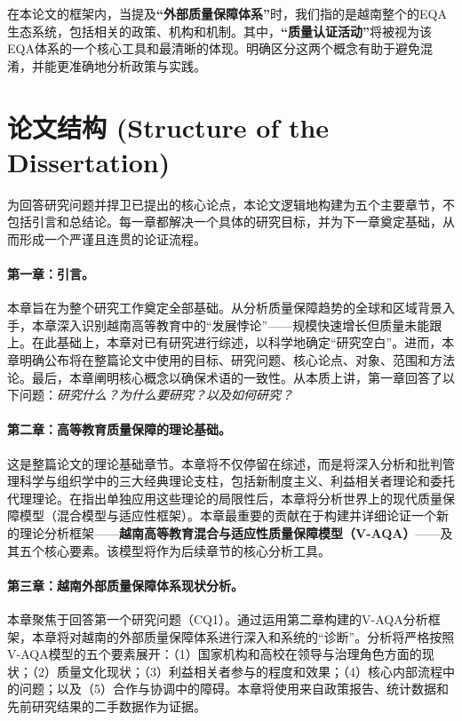 在本论文的框架内，当提及\textbf{“外部质量保障体系”}时，我们指的是越南整个的EQA生态系统，包括相关的政策、机构和机制。其中，\textbf{“质量认证活动”}将被视为该EQA体系的一个核心工具和最清晰的体现。明确区分这两个概念有助于避免混淆，并能更准确地分析政策与实践。

\section{论文结构 (Structure of the Dissertation)}
\label{sec:cau_truc_luan_an}

为回答研究问题并捍卫已提出的核心论点，本论文逻辑地构建为五个主要章节，不包括引言和总结论。每一章都解决一个具体的研究目标，并为下一章奠定基础，从而形成一个严谨且连贯的论证流程。

\paragraph{第一章：引言。}
本章旨在为整个研究工作奠定全部基础。从分析质量保障趋势的全球和区域背景入手，本章深入识别越南高等教育中的“发展悖论”——规模快速增长但质量未能跟上。在此基础上，本章对已有研究进行综述，以科学地确定“研究空白”。进而，本章明确公布将在整篇论文中使用的目标、研究问题、核心论点、对象、范围和方法论。最后，本章阐明核心概念以确保术语的一致性。从本质上讲，第一章回答了以下问题：\textit{研究什么？为什么要研究？以及如何研究？}

\paragraph{第二章：高等教育质量保障的理论基础。}
这是整篇论文的理论基础章节。本章将不仅停留在综述，而是将深入分析和批判管理科学与组织学中的三大经典理论支柱，包括新制度主义、利益相关者理论和委托代理理论。在指出单独应用这些理论的局限性后，本章将分析世界上的现代质量保障模型（混合模型与适应性框架）。本章最重要的贡献在于构建并详细论证一个新的理论分析框架——\textbf{越南高等教育混合与适应性质量保障模型（V-AQA）}——及其五个核心要素。该模型将作为后续章节的核心分析工具。

\paragraph{第三章：越南外部质量保障体系现状分析。}
本章聚焦于回答第一个研究问题（CQ1）。通过运用第二章构建的V-AQA分析框架，本章将对越南的外部质量保障体系进行深入和系统的“诊断”。分析将严格按照V-AQA模型的五个要素展开：（1）国家机构和高校在领导与治理角色方面的现状；（2）质量文化现状；（3）利益相关者参与的程度和效果；（4）核心内部流程中的问题；以及（5）合作与协调中的障碍。本章将使用来自政策报告、统计数据和先前研究结果的二手数据作为证据。

